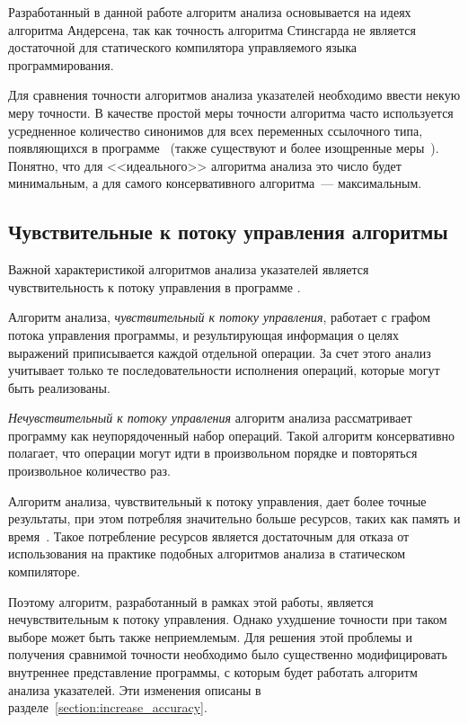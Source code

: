 \documentclass[14pt,titlepage,draft]{extarticle}
\begin{document}
    Разработанный в данной работе алгоритм анализа основывается на идеях
    алгоритма Андерсена, так как точность алгоритма Стинсгарда не является
    достаточной для статического компилятора управляемого языка
    программирования.

    Для сравнения точности алгоритмов анализа указателей необходимо ввести
    некую меру точности. В качестве простой меры точности алгоритма часто
    используется усредненное количество синонимов для всех переменных
    ссылочного типа, появляющихся в
    программе~\cite[раздел~3.2]{hind_pointer_analysis_not_solved_yet}
    (также существуют и более изощренные
    меры~\cite{hind_pointer_analysis_not_solved_yet,diwan_tbaa}).
    Понятно, что для <<идеального>> алгоритма анализа это число будет
    минимальным, а для самого консервативного алгоритма~--- максимальным.

  \subsection{Чувствительные к потоку управления алгоритмы}
    \label{section:choosing_flow_insensitive}

    Важной характеристикой алгоритмов анализа указателей является
    чувствительность к потоку управления в программе
    .

    Алгоритм анализа, \emph{чувствительный к потоку управления}, работает с
    графом потока управления программы, и результирующая информация о целях
    выражений приписывается каждой отдельной операции. За счет этого анализ
    учитывает только те последовательности исполнения операций, которые могут
    быть реализованы.

    \emph{Нечувствительный к потоку управления} алгоритм анализа рассматривает
    программу как неупорядоченный набор операций. Такой алгоритм
    консервативно полагает, что операции могут идти в произвольном порядке и
    повторяться произвольное количество раз.

    Алгоритм анализа, чувствительный к потоку управления, дает более точные
    результаты, при этом потребляя значительно больше ресурсов, таких как
    память и время~\cite[раздел.~4.4]{hind_pointer_analysis_not_solved_yet}.
    Такое потребление ресурсов является достаточным для отказа от
    использования на практике подобных алгоритмов анализа в статическом
    компиляторе.

    Поэтому алгоритм, разработанный в рамках этой работы, является
    нечувствительным к потоку управления. Однако ухудшение точности при таком
    выборе может быть также неприемлемым.
    Для решения этой проблемы и получения сравнимой точности необходимо было
    существенно модифицировать внутреннее представление программы, с которым
    будет работать алгоритм анализа указателей. Эти изменения описаны в
    разделе~\ref{section:increase_accuracy}.
\end{document}
